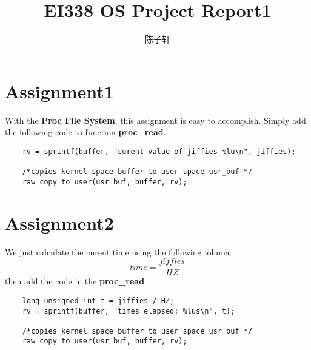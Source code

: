 \documentclass[UTF8]{ctexart}
\title{EI338 OS Project Report1}
\author{陈子轩}
\begin{document}
\maketitle
\section{Assignment1}
With the \textbf{Proc File System}, this assignment is easy to accomplish. Simply add the following code to function \textbf{proc\_read}.
\begin{verbatim}
    rv = sprintf(buffer, "curent value of jiffies %lu\n", jiffies);

    /*copies kernel space buffer to user space usr_buf */
    raw_copy_to_user(usr_buf, buffer, rv);
\end{verbatim}
\section{Assignment2}
We just calculate the curent time using the following foluma
$$time = \frac{jiffies}{HZ}$$
then add the code in the \textbf{proc\_read}
\begin{verbatim}
    long unsigned int t = jiffies / HZ;
    rv = sprintf(buffer, "times elapsed: %lus\n", t);

    /*copies kernel space buffer to user space usr_buf */
    raw_copy_to_user(usr_buf, buffer, rv);
\end{verbatim}
\end{document}
